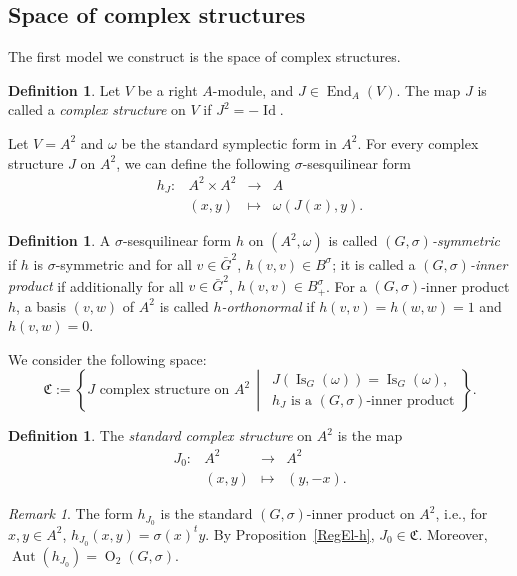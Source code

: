 \documentclass[a4paper,oneside,11pt]{amsart}
\DeclareMathOperator{\Aut}{Aut}
\DeclareMathOperator{\Id}{Id}
\DeclareMathOperator{\OO}{O}
\DeclareMathOperator{\End}{End}
\DeclareMathOperator{\Is}{Is}
\newcommand{\midwd}{\,\middle\vert\,}
\theoremstyle{plain}
\theoremstyle{definition}
\newtheorem{df}[teo]{Definition}
\theoremstyle{remark}
\newtheorem{rem}[teo]{Remark}
\newcommand{\defin}{\emph}
\begin{document}
\subsection{Space of complex structures}\label{Comp_Str_Mod}

The first model we construct is the space of complex structures.

\begin{df}\label{df:complex.str}
Let $V$ be a right $A$-module, and $J\in\End_A(V)$. The map $J$ is called a \defin{complex structure} on $V$ if $J^2=-\Id$.
\end{df}

Let $V=A^2$ and $\omega$ be the standard symplectic form in $A^2$. For every complex structure $J$ on $A^2$, we can define the following $\sigma$-sesquilinear form
$$\begin{matrix}
h_J\colon & A^2\times A^2 & \to & A \\
& (x,y) & \mapsto & \omega(J(x),y).
\end{matrix}$$

\begin{df}
A $\sigma$-sesquilinear form $h$ on $(A^2,\omega)$ is called \defin{$(G,\sigma)$-symmetric} if $h$ is $\sigma$-symmetric and for all $v\in\bar G^2$, $h(v,v)\in B^{\sigma}$; it is called a \defin{$(G,\sigma)$-inner product} if additionally for all $v\in\bar G^2$, $h(v,v)\in B^{\sigma}_+$. For a $(G,\sigma)$-inner product $h$, a basis $(v,w)$ of $A^2$ is called \defin{$h$-orthonormal} if $h(v,v)=h(w,w)=1$ and $h(v,w)=0$.
\end{df}

We consider the following space:
$$\mathfrak C:=\left\{J\text{ complex structure on $A^2$}\midwd\begin{array}{l}
J(\Is_G(\omega))=\Is_G(\omega),\\
h_J\text{ is a $(G,\sigma)$-inner product}
\end{array}\right\}.$$

\begin{df}
The \defin{standard complex structure} on $A^2$ is the map
$$\begin{matrix}
J_0\colon & A^2 & \to & A^2 \\
& (x,y) & \mapsto & (y,-x).
\end{matrix}$$
\end{df}

\begin{rem}
The form $h_{J_0}$ is the standard $(G,\sigma)$-inner product on $A^2$, i.e., for $x,y\in A^2$, $h_{J_0}(x,y)=\sigma(x)^ty$. By Proposition~\ref{RegEl-h}, $J_0\in \mathfrak C$. Moreover, $\Aut(h_{J_0})=\OO_2(G,\sigma)$.
\end{rem}
\end{document}
